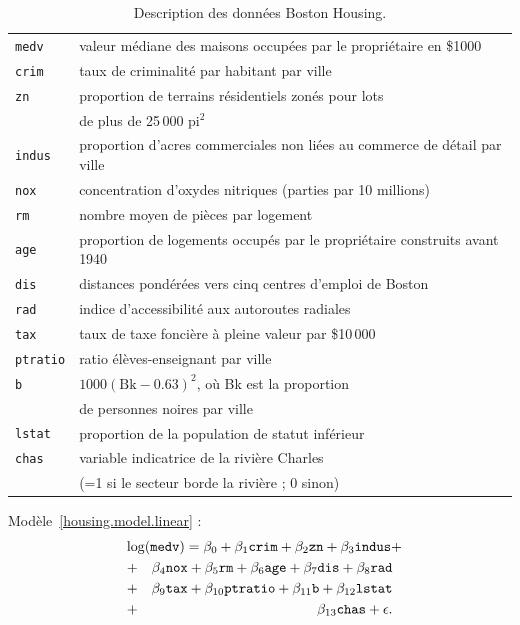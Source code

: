 \documentclass{BeamerTemplate}
\begin{document}
\begin{refsection}
\begin{frame}{}
\begin{table}[htbp]
  \begin{center}
{\small \begin{tabular}{ll}
\hline
\texttt{medv} & valeur médiane des maisons occupées par le propriétaire en \$1000\\
\texttt{crim} & taux de criminalité par habitant par ville\\
\texttt{zn} & proportion de terrains résidentiels zonés pour lots \\
 & de plus de 25\,000 pi$^2$\\
\texttt{indus} & proportion d'acres commerciales non liées au commerce de détail par ville\\
\texttt{nox} & concentration d'oxydes nitriques (parties par 10 millions)\\
\texttt{rm} & nombre moyen de pièces par logement\\
\texttt{age} & proportion de logements occupés par le propriétaire construits avant 1940\\
\texttt{dis} & distances pondérées vers cinq centres d'emploi de Boston\\
\texttt{rad} & indice d'accessibilité aux autoroutes radiales\\
\texttt{tax} & taux de taxe foncière à pleine valeur par \$10\,000\\
\texttt{ptratio} & ratio élèves-enseignant par ville\\
\texttt{b} & $1000(\mbox{Bk}-0.63)^2$, où Bk est la proportion \\
 & de personnes noires par ville\\
\texttt{lstat} & proportion de la population de statut inférieur\\
\texttt{chas} & variable indicatrice de la rivière Charles \\
& (=1 si le secteur borde la rivière ; 0 sinon)\\
\hline
\end{tabular}}
  \end{center}
\caption{Description des données Boston Housing.}
\label{housing.table}
\end{table}
\end{frame}


\begin{frame}[fragile]{}

Modèle~\eqref{housing.model.linear} :
\begin{eqnarray}
\label{housing.model.linear}
\lefteqn{\log(\texttt{medv}) = \beta_0 + \beta_1\texttt{crim} + \beta_2\texttt{zn}+
\beta_3\texttt{indus}+ } \nonumber \\
& + & \beta_4\texttt{nox} + \beta_5\texttt{rm} + \beta_6\texttt{age} +
\beta_7\texttt{dis} + \beta_8\texttt{rad} \nonumber \\
& + & \beta_9\texttt{tax} + \beta_{10}\texttt{ptratio} + \beta_{11}\texttt{b} +
\beta_{12}\texttt{lstat} \nonumber \\
& + & \beta_{13} \texttt{chas} + \epsilon.
\end{eqnarray}


\end{frame}
\end{refsection}
\end{document}
